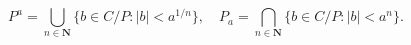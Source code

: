 $$P^a = \bigcup_{n \in \mathbf{N}} \{b \in C/P: |b| < a^{1/n}\}, \quad P_a = \bigcap_{n \in \mathbf{N}} \{b \in C/P: |b| < a^n\}.$$
